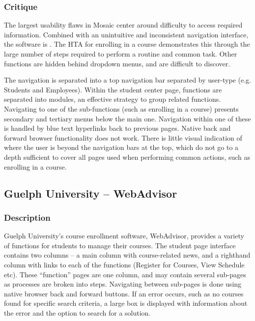 \documentclass[10pt]{article}
\newenvironment{InlineColumnFigure}
{\par\medskip\noindent\minipage{\linewidth}}
{\endminipage\par\medskip}
\newcommand{\Caption}[1]
{\vspace{-4mm}\fontsize{9}{9}\textbf{Figure \refstepcounter{figCounter} 
\arabic{figCounter}: #1}}
\newcounter{figCounter}
\begin{document}
\begin{multicols}{2}
\subsubsection*{Critique}
The largest usability flaws in Mosaic center around difficulty to access 
required information. Combined with an unintuitive and inconsistent navigation 
interface, the software is . The HTA for enrolling in a course demonstrates this 
through the large number of steps required to perform a routine and common task. 
Other functions are hidden behind dropdown menus, and are difficult to discover.


The navigation is separated into a top navigation bar separated by user-type 
(e.g. Students and Employees). Within the student center page, functions are 
separated into modules, an effective strategy to group related functions. 
Navigating to one of the sub-functions (such as enrolling in a course) presents 
secondary and tertiary menus below the main one. Navigation within one of these 
is handled by blue text hyperlinks back to previous pages. Native back and 
forward browser functionality does not work. There is little visual indication 
of where the user is beyond the navigation bars at the top, which do not go to a 
depth sufficient to cover all pages used when performing common actions, such as 
enrolling in a course.

\subsection*{Guelph University -- WebAdvisor}
\subsubsection*{Description}
Guelph University's course enrollment software, WebAdvisor, provides a variety 
of functions for students to manage their courses. The student page interface 
contains two columns -- a main column with course-related news, and a righthand 
column with links to each of the functions (Register for Courses, View Schedule 
etc). These ``function'' pages are one column, and may contain several sub-pages 
as processes are broken into steps. Navigating between sub-pages is done using 
native browser back and forward buttons. If an error occurs, such as no courses 
found for specific search criteria, a large box is displayed with information 
about the error and the option to search for a solution.



\end{multicols}
\end{document}
